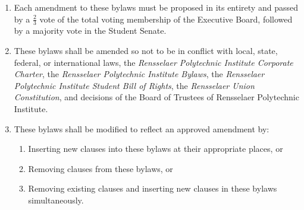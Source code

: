 \begin{enumerate}

    \item Each amendment to these bylaws must be proposed in its entirety and passed by a $\frac{2}{3}$ vote of the total voting membership of the Executive Board, followed by a majority vote in the Student Senate.

    \item These bylaws shall be amended so not to be in conflict with local, state, federal, or international laws, the \textit{Rensselaer Polytechnic Institute Corporate Charter}, the \textit{Rensselaer Polytechnic Institute Bylaws}, the \textit{Rensselaer Polytechnic Institute Student Bill of Rights}, the \textit{Rensselaer Union Constitution}, and decisions of the Board of Trustees of Rensselaer Polytechnic Institute.

    \item These bylaws shall be modified to reflect an approved amendment by:
    \begin{enumerate}
        \item Inserting new clauses into these bylaws at their appropriate places, or
        \item Removing clauses from these bylaws, or
        \item Removing existing clauses and inserting new clauses in these bylaws simultaneously.
    \end{enumerate}

\end{enumerate}
